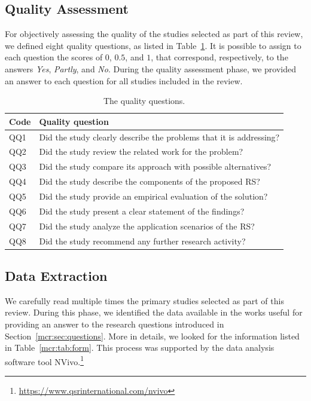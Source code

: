 \subsection{Quality Assessment}

For objectively assessing the quality of the studies selected as part of this review, we defined eight quality questions, as listed in Table~\ref{mcr:tab:quality}. It is possible to assign to each question the scores of $0$, $0.5$, and $1$, that correspond, respectively, to the answers \emph{Yes}, \emph{Partly}, and \emph{No}. During the quality assessment phase, we provided an answer to each question for all studies included in the review.
 
\begin{table}
\centering
\begin{tabular}{@{}ll@{}}
\toprule
Code & Quality question \\ \midrule
QQ1 & Did the study clearly describe the problems that it is addressing? \\
QQ2 & Did the study review the related work for the problem? \\
QQ3 & Did the study compare its approach with possible alternatives? \\
QQ4 & Did the study describe the components of the proposed RS? \\
QQ5 & Did the study provide an empirical evaluation of the solution? \\
QQ6 & Did the study present a clear statement of the findings? \\
QQ7 & Did the study analyze the application scenarios of the RS? \\
QQ8 & Did the study recommend any further research activity? \\ \bottomrule
\end{tabular}
\caption[Quality questions]{The quality questions.}
\label{mcr:tab:quality}
\end{table}

\subsection{Data Extraction}

We carefully read multiple times the primary studies  selected as part of this review. During this phase, we identified the data available in the works useful for providing an answer to the research questions introduced in Section~\ref{mcr:sec:questions}. More in details, we looked for the information listed in Table~\ref{mcr:tab:form}. This process was supported by the data analysis software tool NVivo.\footnote{\url{https://www.qsrinternational.com/nvivo}} 

